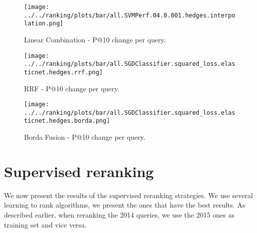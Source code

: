 \begin{table}[h!]
\centering
\caption{Linear Combination - Number of better/worse queries per intent type.}
\label{change-per-query-table-lincomb}
\end{table}

\begin{figure}[h!]
\centerline{
  \texttt{[image: ../../ranking/plots/bar/all.SVMPerf.04.0.001.hedges.interpolation.png]}
  }
  \caption{Linear Combination - P@10 change per query.}
  \label{interp-query}
\end{figure}

\begin{figure}
\centerline{
  \texttt{[image: ../../ranking/plots/bar/all.SGDClassifier.squared\_loss.elasticnet.hedges.rrf.png]}
  }
  \caption{RRF - P@10 change per query.}
  \label{rrf-query}
\end{figure}

\begin{figure}
\centerline{
  \texttt{[image: ../../ranking/plots/bar/all.SGDClassifier.squared\_loss.elasticnet.hedges.borda.png]}
  }
  \caption{Borda Fusion - P@10 change per query.}
  \label{borda-query}
\end{figure}


\section{Supervised reranking}

We now present the results of the supervised reranking strategies. We use several learning to rank algorithms, we present the ones that have the best results.
As described earlier, when reranking the 2014 queries, we use the 2015 ones as training set and vice versa.

